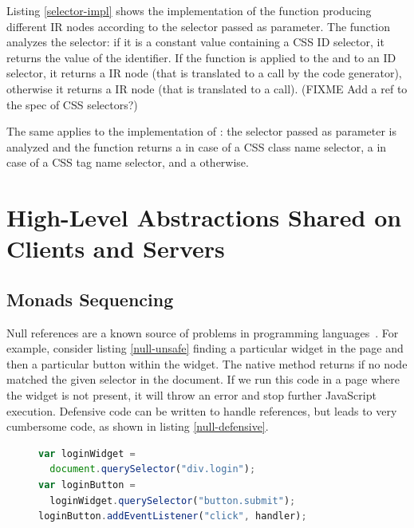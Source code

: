 \documentclass[preprint]{sigplanconf}
\begin{document}
Listing \ref{selector-impl} shows the implementation of the  function producing different
IR nodes according to the selector passed as parameter. The  function analyzes
the selector: if it is a constant  value containing a CSS ID selector, it returns the
value of the identifier. If the  function is applied to the  and to an ID
selector, it returns a  IR node (that is translated to a
 call by the code generator), otherwise it returns a
 IR node (that is translated to a  call). (FIXME Add a ref to
the spec of CSS selectors?)

The same applies to the implementation of : the selector passed as parameter is
analyzed and the function returns a  in case of a CSS class
name selector, a  in case of a CSS tag name selector, and a
 otherwise.


\section{High-Level Abstractions Shared on Clients and Servers}
\label{contribution-shared}

\subsection{Monads Sequencing}

Null references are a known source of problems in programming
languages~\cite{Hoare09_Null,Nanda09_Null}. For example, consider listing \ref{null-unsafe} finding
a particular widget in the page and then a particular button within the widget. The native
 method returns  if no node matched the given selector in the
document. If we run this code in a page where the widget is not present, it will throw an error
and stop further JavaScript execution. Defensive code can be written to handle 
references, but leads to very cumbersome code, as shown in listing \ref{null-defensive}.

\begin{figure}
\begin{lstlisting}[language=JavaScript,label=null-unsafe,caption=Unsafe code]
var loginWidget =
  document.querySelector("div.login");
var loginButton =
  loginWidget.querySelector("button.submit");
loginButton.addEventListener("click", handler);
\end{lstlisting}
\end{figure}
\end{document}
